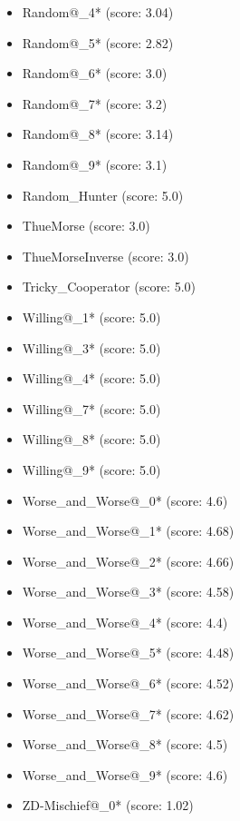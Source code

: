 \begin{appendices}
\begin{itemize}
\begin{multicols}{3}
\begin{itemize}
            \item Random@\_4* (score: 3.04)
            \item Random@\_5* (score: 2.82)
            \item Random@\_6* (score: 3.0)
            \item Random@\_7* (score: 3.2)
            \item Random@\_8* (score: 3.14)
            \item Random@\_9* (score: 3.1)
            \item Random\_Hunter (score: 5.0)
            \item ThueMorse (score: 3.0)
            \item ThueMorseInverse (score: 3.0)
            \item Tricky\_Cooperator (score: 5.0)
            \item Willing@\_1* (score: 5.0)
            \item Willing@\_3* (score: 5.0)
            \item Willing@\_4* (score: 5.0)
            \item Willing@\_7* (score: 5.0)
            \item Willing@\_8* (score: 5.0)
            \item Willing@\_9* (score: 5.0)
            \item Worse\_and\_Worse@\_0* (score: 4.6)
            \item Worse\_and\_Worse@\_1* (score: 4.68)
            \item Worse\_and\_Worse@\_2* (score: 4.66)
            \item Worse\_and\_Worse@\_3* (score: 4.58)
            \item Worse\_and\_Worse@\_4* (score: 4.4)
            \item Worse\_and\_Worse@\_5* (score: 4.48)
            \item Worse\_and\_Worse@\_6* (score: 4.52)
            \item Worse\_and\_Worse@\_7* (score: 4.62)
            \item Worse\_and\_Worse@\_8* (score: 4.5)
            \item Worse\_and\_Worse@\_9* (score: 4.6)
            \item ZD-Mischief@\_0* (score: 1.02)
        \end{itemize}
     \end{multicols}
     
    \end{itemize}


\end{appendices}
